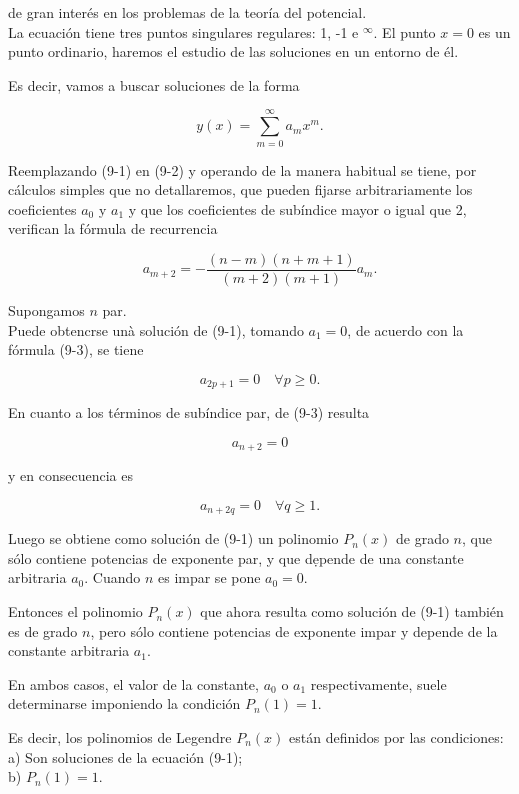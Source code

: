 \documentclass[10pt]{article}
\theoremstyle{plain}
\theoremstyle{definition}
\theoremstyle{remark}
\begin{document}
de gran interés en los problemas de la teoría del potencial.\\
La ecuación tiene tres puntos singulares regulares: 1, -1 e ${ }^{\infty}$. El punto $x=0$ es un punto ordinario, haremos el estudio de las soluciones en un entorno de él.

Es decir, vamos a buscar soluciones de la forma


\begin{equation*}
y(x)=\sum_{m=0}^{\infty} a_{m} x^{m} . \tag{$9\cdot2$}
\end{equation*}


Reemplazando (9-1) en (9-2) y operando de la manera habitual se tiene, por cálculos simples que no detallaremos, que pueden fijarse arbitrariamente los coeficientes $a_{0}$ y $a_{1}$ y que los coeficientes de subíndice mayor o igual que 2, verifican la fórmula de recurrencia


\begin{equation*}
a_{m+2}=-\frac{(n-m)(n+m+1)}{(m+2)(m+1)} a_{m} . \tag{9-3}
\end{equation*}


Supongamos $n$ par.\\
Puede obtencrse unà solución de (9-1), tomando $a_{1}=0$, de acuerdo con la fórmula (9-3), se tiene

$$
a_{2 p+1}=0 \quad \forall p \geqslant 0 .
$$

En cuanto a los términos de subíndice par, de (9-3) resulta

$$
a_{n+2}=0
$$

y en consecuencia es

$$
a_{n+2 q}=0 \quad \forall q \geqslant 1 .
$$

Luego se obtiene como solución de (9-1) un polinomio $P_{n}(x)$ de grado $n$, que sólo contiene potencias de exponente par, y que dẹpende de una constante arbitraria $a_{0}$. Cuando $n$ es impar se pone $a_{0}=0$.

Entonces el polinomio $P_{n}(x)$ que ahora resulta como solución de (9-1) también es de grado $n$, pero sólo contiene potencias de exponente impar y depende de la constante arbitraria $a_{1}$.

En ambos casos, el valor de la constante, $a_{0}$ o $a_{1}$ respectivamente, suele determinarse imponiendo la condición $P_{n}(1)=1$.

Es decir, los polinomios de Legendre $P_{n}(x)$ están definidos por las condiciones:\\
a) Son soluciones de la ecuación (9-1);\\
b) $P_{n}(1)=1$.
\end{document}
